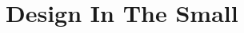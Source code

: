 \documentclass[../DD.tex]{subfiles}
\begin{document}
\chapter{Design In The Small}
\thispagestyle{fancy}
	
	
	
	
	
\end{document}

